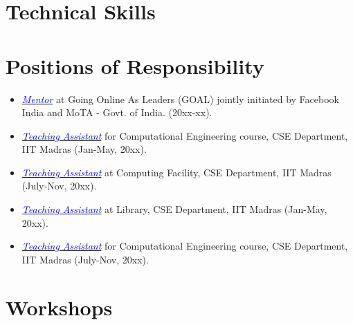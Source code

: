 \documentclass[11pt,a4paper,sans]{moderncv}        %
\begin{document}
\vspace{-1em}
\section{Technical Skills}




\vspace{-1em}
\section{Positions of Responsibility}
\begin{itemize}
\item \textit{{\href{https://someLinks}
              {\textcolor{blue}{Mentor}}}} at Going Online As Leaders (GOAL) jointly initiated by Facebook India and MoTA - Govt. of India. (20xx-xx).

\item \textit{{\href{https://someLinks}{\textcolor{blue}{Teaching Assistant}}}} for Computational Engineering course, CSE Department, IIT Madras (Jan-May, 20xx).

\item \textit{{\href{https://someLinks}{\textcolor{blue}{Teaching Assistant}}}} at Computing Facility, CSE Department, IIT Madras (July-Nov, 20xx). 

\item \textit{{\href{https://someLinks}{\textcolor{blue}{Teaching Assistant}}}} at Library, CSE Department, IIT Madras (Jan-May, 20xx).

\item \textit{{\href{https://someLinks}{\textcolor{blue}{Teaching Assistant}}}} for Computational Engineering course, CSE Department, IIT Madras (July-Nov, 20xx).
\end{itemize}


\vspace{-1em}
\section{Workshops}
\end{document}
